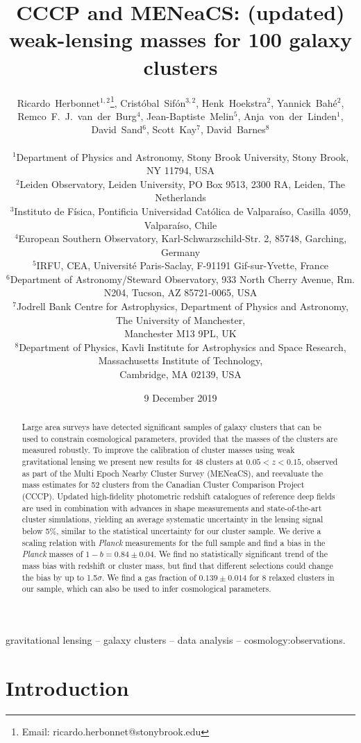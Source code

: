 \documentclass[useAMS,usenatbib]{mnras}
\title[CCCP and MENeaCS]
  {CCCP and MENeaCS: (updated) weak-lensing masses for 100 galaxy clusters}
\author[Ricardo Herbonnet et al.]
{\parbox[t]{\textwidth}{\vspace{-0.7cm}
\begin{flushleft}
  Ricardo~Herbonnet$^{1,2}$\thanks{Email: ricardo.herbonnet@stonybrook.edu}, 
  Crist\'{o}bal~Sif\'{o}n$^{3,2}$, 
  Henk~Hoekstra$^2$, 
  Yannick~Bah\'{e}$^2$, 
  Remco~F.~J.~van~der~Burg$^{4}$, 
  Jean-Baptiste~Melin$^{5}$, 
  Anja~von~der~Linden$^{1}$,
  David~Sand$^{6}$,
  Scott~Kay$^{7}$,
  David~Barnes$^{8}$
  \end{flushleft}
  }
  \\
  $^1$Department of Physics and Astronomy, Stony Brook University, Stony Brook, NY 11794, USA\\
  $^2$Leiden Observatory, Leiden University, PO Box 9513, 2300 RA, Leiden, The 
Netherlands\\
  $^3$Instituto de F\'isica, Pontificia Universidad Cat\'olica de Valpara\'iso, Casilla 4059, Valpara\'iso, Chile\\
  $^4$European Southern Observatory, Karl-Schwarzschild-Str. 2, 85748, Garching, Germany\\
  $^5$IRFU, CEA, Universit{\'e} Paris-Saclay, F-91191 Gif-sur-Yvette, France\\
  $^6$Department of Astronomy/Steward Observatory, 933 North Cherry Avenue, Rm. N204, Tucson, AZ 85721-0065, USA\\
  $^7$Jodrell Bank Centre for Astrophysics, Department of Physics and Astronomy, The University of Manchester,\\ Manchester M13 9PL, UK\\
  $^8$Department of Physics, Kavli Institute for Astrophysics and Space Research, Massachusetts Institute of Technology,\\ Cambridge, MA 02139, USA​
}
\date{9 December 2019}
\begin{document}
\label{firstpage}

\maketitle

\begin{abstract}
Large area surveys have detected significant samples of galaxy clusters that can be used to constrain cosmological parameters, provided that the masses of the clusters are measured robustly. To improve the calibration of cluster masses using weak gravitational lensing we present new results for 48 clusters at $0.05<z<0.15$, observed as part of the Multi Epoch Nearby Cluster Survey (MENeaCS), and reevaluate the mass estimates for 52 clusters from the Canadian Cluster Comparison Project (CCCP).
Updated high-fidelity photometric redshift catalogues of reference deep fields are used in combination with advances in shape measurements and state-of-the-art cluster simulations, yielding an average systematic uncertainty in the lensing signal below 5\%, similar to the statistical uncertainty for our cluster sample. We derive a scaling relation with \textit{Planck} measurements for the full sample and find a bias in the \textit{Planck} masses of $1-b=0.84 \pm 0.04$.  We find no statistically significant trend of the mass bias with redshift or cluster mass, but find that different selections could change the bias by up to 1.5$\sigma$. We find a gas fraction of $0.139 \pm 0.014$ for 8 relaxed clusters in our sample, which can also be used to infer cosmological parameters. 
\end{abstract}

\begin{keywords}
 gravitational lensing -- galaxy clusters -- data analysis -- 
cosmology:observations.
\end{keywords}






\section{Introduction}
\label{intro}
\end{document}
